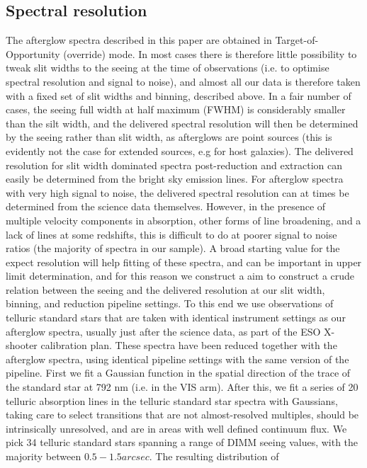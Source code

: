 \documentclass[iop, twocolappendix, numberedappendix, tighten, appendixfloats]{emulateapj}
\begin{document}
	\subsection{Spectral resolution}
	The afterglow spectra described in this paper are obtained in Target-of-Opportunity (override) mode.
	In most cases there is therefore little possibility to tweak slit widths to the seeing at the time of observations
	(i.e. to optimise spectral resolution and signal to noise), and almost all our data is therefore taken with a fixed
	set of slit widths and binning, described above. In a fair number of cases, the seeing full width at half maximum (FWHM) 
	is considerably smaller than the silt width, and the delivered spectral resolution will then be determined by the seeing rather 
	than slit width, as afterglows are point sources (this is evidently not the case for extended sources, e.g for host galaxies).
	The delivered resolution for slit width dominated spectra post-reduction and extraction can easily be determined 
	from the bright sky emission lines. For afterglow spectra with very high signal to noise, the delivered spectral resolution 
	can at times be determined from the science data themselves. However, in the presence of multiple velocity components in 
	absorption, other forms of line broadening, and a lack of lines at some redshifts, this is difficult to do at poorer signal to noise ratios
	(the majority of spectra in our sample). A broad starting value for the expect resolution will help fitting of these spectra, and can be important
	in upper limit determination, and for this reason we construct a aim to construct a crude relation between the seeing and the delivered
	resolution at our slit width, binning, and reduction pipeline settings.  
	To this end we use observations of telluric standard stars that are taken with identical instrument settings as our afterglow spectra, usually just after 
	the science data, as part of the ESO X-shooter calibration plan. These spectra have been reduced together with the afterglow spectra, using identical
	pipeline settings with the same version of the pipeline.
	First we fit a Gaussian function in the spatial direction of the trace of the standard star at 792 nm (i.e. in the VIS arm). 
	After this, we fit a series of  20 telluric absorption lines in the telluric standard star spectra with Gaussians, taking care to select transitions 
	that are not almost-resolved multiples, should be intrinsically unresolved, and are in areas with well defined continuum flux.  We pick 34 
	telluric standard stars spanning a range of DIMM seeing values, with the majority between $0.5-1.5 arcsec$. The resulting distribution of 
\end{document}
